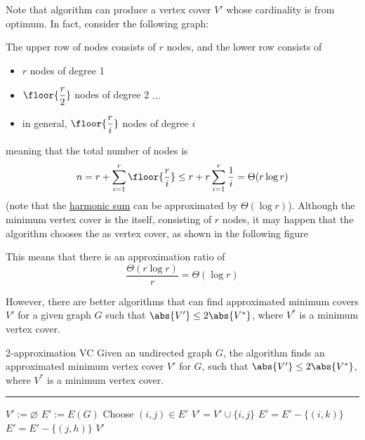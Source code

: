 \documentclass[a4paper, 12pt]{report}
\begin{document}
    Note that algorithm can produce a vertex cover $V'$ whose cardinality is  from optimum. In fact, consider the following graph:


    The upper row of nodes consists of $r$ nodes, and the lower row consists of

    \begin{itemize}
        \item $r$ nodes of degree 1
        \item $\floor{\dfrac{r}{2}}$ nodes of degree 2 $\ldots$
        \item in general, $\floor{\dfrac{r}{i}}$ nodes of degree $i$
    \end{itemize}

    meaning that the total number of nodes is $$n = r + \sum_{i = 1}^r{\floor{\dfrac{r}{i}}} \le r + r \sum_{i = 1} ^r{\dfrac{1}{i}} = \Theta(r \log r)$$ (note that the \href{https://en.wikipedia.org/wiki/Harmonic_series_(mathematics)}{harmonic sum} can be approximated by $\Theta(\log r)$). Although the  minimum vertex cover is the  itself, consisting of $r$ nodes, it may happen that the algorithm chooses the  as vertex cover, as shown in the following figure 


    This means that there is an approximation ratio of $$\dfrac{\Theta(r \log r)}{r} = \Theta(\log r)$$

    However, there are better algorithms that can find approximated minimum covers $V'$ for a given graph $G$ such that $\abs{V'} \le 2 \abs {V^*}$, where $V^*$ is a minimum vertex cover.

    \begin{framedalgo}{2-approximation VC}
        Given an undirected graph $G$, the algorithm finds an approximated minimum vertex cover $V'$ for $G$, such that $\abs{V'} \le 2 \abs {V^*}$, where $V^*$ is a minimum vertex cover. \\
        \hrule

        \quad
        \label{alg:2-approx_vc}
        \begin{algorithmic}[1]
                \State $V' := \varnothing$
                \State $E' := E(G)$
                    \State Choose $(i, j) \in E'$
                    \State $V' = V' \cup \{i, j\}$
                     
                        \State $E' = E' - \{(i, k) \}$
                    \EndFor
                     
                        \State $E' = E' - \{(j, h) \}$
                    \EndFor
                \EndWhile
                \State {} $V'$
            \EndFunction
        \end{algorithmic}
    \end{framedalgo}
\end{document}
